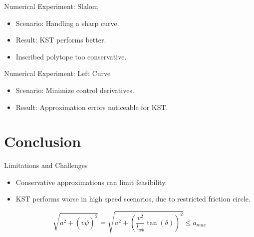 \documentclass[shortpres,aspectratio=43]{beamer}
\begin{document}
\begin{frame}{Numerical Experiment: Slalom}
  \begin{itemize}
    \item Scenario: Handling a sharp curve.
    \item Result: KST performs better.
    \item Inscribed polytope too conservative.
  \end{itemize}
\end{frame}

\begin{frame}{Numerical Experiment: Left Curve}
  \begin{itemize}
    \item Scenario: Minimize control derivatives.
    \item Result: Approximation errors noticeable for KST.
  \end{itemize}
\end{frame}

\section{Conclusion}

\begin{frame}{Limitations and Challenges}
  \begin{itemize}
    \item Conservative approximations can limit feasibility.
    \item KST performs worse in high speed scenarios, due to restricted friction circle.
  \end{itemize}
  \begin{equation}
    \sqrt{a^2 + \left(v\dot{\psi}\right)^2} = \sqrt{a^2 + \left(\frac{v^2}{l_{wb}} \tan(\delta)\right)^2} \leq a_{max}
  \end{equation}
\end{frame}
\end{document}
